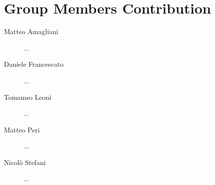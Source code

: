 \section{Group Members Contribution}


\begin{description}
	\item[Matteo Amagliani] ...
	\item[Daniele Francescato] ...
	\item[Tomamso Leoni] ...
	\item[Matteo Peri] ...
	\item[Nicolò Stefani] ...
\end{description}

